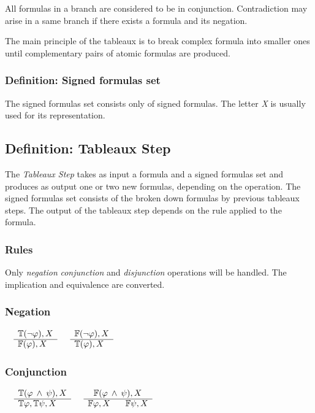 \documentclass{article}
\begin{document}
	All formulas in a branch are considered to be in conjunction. Contradiction may arise in a same branch if there exists a formula and its negation.

	The main principle of the tableaux is to break complex formula into smaller ones until complementary pairs of atomic formulas are produced.

	\subsubsection*{Definition: Signed formulas set}
	The signed formulas set consists only of signed formulas. The letter \textit{X} is usually used for its representation.

	\subsection{Definition: Tableaux Step}
	The \textit{Tableaux Step} takes as input a formula and a signed formulas set and produces as output one or two new formulas, depending on the operation.
	The signed formulas set consists of the broken down formulas by previous tableaux steps.
	The output of the tableaux step depends on the rule applied to the formula.

	\subsubsection{Rules}
	Only \textit{negation} \textit{conjunction} and \textit{disjunction} operations will be handled. The implication and equivalence are converted.

		\subsubsection*{Negation}
			$\begin{array}{rl}
				& \mathbb{T}(\neg \varphi), X \\
			      \cline{2-2}
			      & \mathbb{F}(\varphi), X
			\end{array}$
			\:\:\:\:\:\:\:\:\:\:\:\:\:\:\:\:\:\:\:\:\:\:\:\:\:\:\:\:\:\:\:\:\:\:\:\:\:\:\:\:\:\:\:\:\:\:\:\:
			$\begin{array}{rl}
				& \mathbb{F}(\neg \varphi), X \\
			      \cline{2-2}
			      & \mathbb{T}(\varphi), X
			\end{array}$

		\subsubsection*{Conjunction}
			$\begin{array}{rl}
				& \mathbb{T}(\varphi \: \wedge \: \psi), X \\
			      \cline{2-2}
			      & \mathbb{T}\varphi, \mathbb{T}\psi, X
			\end{array}$
			\:\:\:\:\:\:\:\:\:\:\:\:\:\:\:\:\:\:\:\:\:\:\:\:\:\:\:\:\:\:\:\:\:\:\:
			$\begin{array}{rl}
				& \:\:\: \mathbb{F}(\varphi \: \wedge \: \psi), X \\
			      \cline{2-2}
			      & \mathbb{F}\varphi, X \:\:\:\:\:\:\:\: \mathbb{F}\psi, X
			\end{array}$
\end{document}
